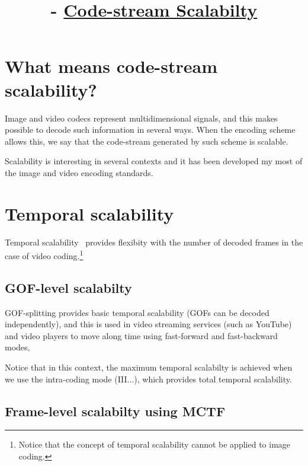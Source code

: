 


\title{\SM{} -  \href{https://github.com/Sistemas-Multimedia/Sistemas-Multimedia.github.io/tree/master/contents/data_scalability}{Code-stream Scalabilty}}

\maketitle
\tableofcontents

\section{What means code-stream scalability?}

Image and video codecs represent multidimensional signals, and this
makes possible to decode such information in several ways. When the
encoding scheme allows this, we say that the code-stream generated by
such scheme is scalable.

Scalability is interesting in several contexts and it has been
developed my most of the image and video encoding standards.

\section{Temporal scalability}

Temporal scalability~\cite{vruiz__video_scalability} provides
flexibity with the number of decoded frames in the case of video
coding.\footnote{Notice that the concept of temporal scalability
  cannot be applied to image coding.}

\subsection{GOF-level scalabilty}
GOF-splitting provides basic temporal scalability (GOFs can be decoded
independently), and this is used in video streaming services (such as
YouTube) and video players to move along time using fast-forward and
fast-backward modes,
  
Notice that in this context, the maximum temporal scalabilty is
achieved when we use the intra-coding mode (III...), which provides
total temporal scalability.

\subsection{Frame-level scalabilty using MCTF}

